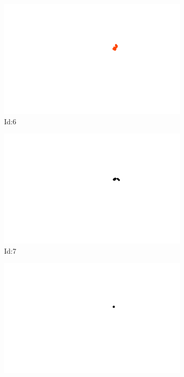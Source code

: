 \documentclass[12pt,twoside]{report}
\begin{document}
\begin{figure}
\centering
\begin{subfigure}[b]{0.20\textwidth}
\centering
\includegraphics[width=\textwidth]{../../trajectories/6.png}
\caption{Id:6}
\end{subfigure}
\begin{subfigure}[b]{0.20\textwidth}
\centering
\includegraphics[width=\textwidth]{../../trajectories/7.png}
\caption{Id:7}
\end{subfigure}
\begin{subfigure}[b]{0.20\textwidth}
\centering
\includegraphics[width=\textwidth]{../../trajectories/14.png}

\end{subfigure}
\end{figure}
\end{document}
